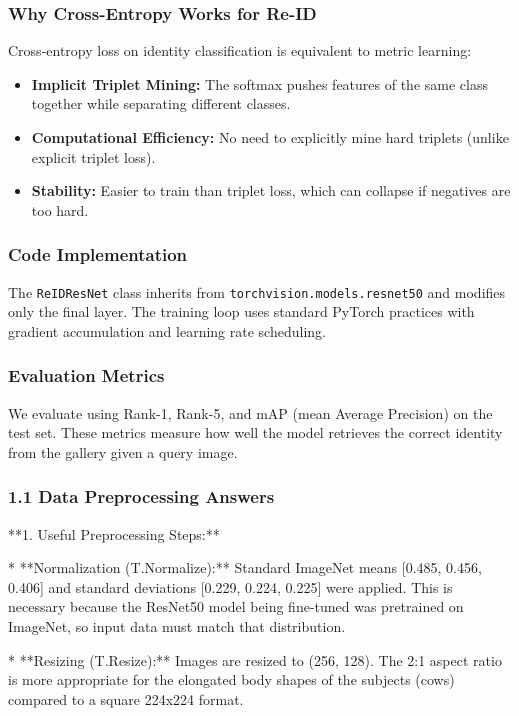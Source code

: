 \documentclass[a4paper,12pt]{article}
\begin{document}
\subsubsection*{Why Cross-Entropy Works for Re-ID}
Cross-entropy loss on identity classification is equivalent to metric learning:

\begin{itemize}
    \item \textbf{Implicit Triplet Mining:} The softmax pushes features of the same class together while separating different classes.
    \item \textbf{Computational Efficiency:} No need to explicitly mine hard triplets (unlike explicit triplet loss).
    \item \textbf{Stability:} Easier to train than triplet loss, which can collapse if negatives are too hard.
\end{itemize}

\subsubsection*{Code Implementation}
The \texttt{ReIDResNet} class inherits from \texttt{torchvision.models.resnet50} and modifies only the final layer. The training loop uses standard PyTorch practices with gradient accumulation and learning rate scheduling.

\subsubsection*{Evaluation Metrics}
We evaluate using Rank-1, Rank-5, and mAP (mean Average Precision) on the test set. These metrics measure how well the model retrieves the correct identity from the gallery given a query image.

\subsubsection*{1.1 Data Preprocessing Answers}

**1. Useful Preprocessing Steps:**

* **Normalization (T.Normalize):** Standard ImageNet means [0.485, 0.456, 0.406] and standard deviations [0.229, 0.224, 0.225] were applied. This is necessary because the ResNet50 model being fine-tuned was pretrained on ImageNet, so input data must match that distribution.

* **Resizing (T.Resize):** Images are resized to (256, 128). The 2:1 aspect ratio is more appropriate for the elongated body shapes of the subjects (cows) compared to a square 224x224 format.
\end{document}
